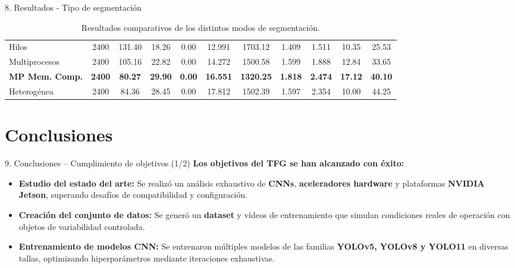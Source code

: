 \documentclass[spanish]{beamer}
\begin{document}
\begin{frame}{8. Resultados - Tipo de segmentación}
\begin{table}[H]
{\begin{tabular}{|l|c|c|c|c|c|c|c|c|c|c|}
            Hilos & 2400 & 131.40 & 18.26 & 0.00 & 12.991 & 1703.12 & 1.409 & 1.511 & 10.35 & 25.53 \\
            Multiprocesos & 2400 & 105.16 & 22.82 & 0.00 & 14.272 & 1500.58 & 1.599 & 1.888 & 12.84 & 33.65 \\
            \textbf{MP Mem. Comp.} & \textbf{2400} & \textbf{80.27} & \textbf{29.90} & \textbf{0.00} & \textbf{16.551} & \textbf{1320.25} & \textbf{1.818} & \textbf{2.474} & \textbf{17.12} & \textbf{40.10} \\
            Heterogénea & 2400 & 84.36 & 28.45 & 0.00 & 17.812 & 1502.39 & 1.597 & 2.354 & 10.00 & 44.25 \\
            \hline
        \end{tabular}%
        }


    \caption{Resultados comparativos de los distintos modos de segmentación.}
    \end{table}

    \vspace{0.2cm}
\end{frame}



\section{Conclusiones}
\begin{frame}{9. Conclusiones -- Cumplimiento de objetivos (1/2)}
    \textbf{Los objetivos del TFG se han alcanzado con éxito:}
    \begin{itemize}
        \item \textbf{Estudio del estado del arte:} Se realizó un análisis exhaustivo de \textbf{CNNs}, \textbf{aceleradores hardware} y plataformas \textbf{NVIDIA Jetson}, superando desafíos de compatibilidad y configuración.
        \item \textbf{Creación del conjunto de datos:} Se generó un \textbf{dataset} y vídeos de entrenamiento que simulan condiciones reales de operación con objetos de variabilidad controlada.
        \item \textbf{Entrenamiento de modelos CNN:} Se entrenaron múltiples modelos de las familias \textbf{YOLOv5, YOLOv8 y YOLO11} en diversas tallas, optimizando hiperparámetros mediante iteraciones exhaustivas.
    \end{itemize}
\end{frame}
\end{document}
